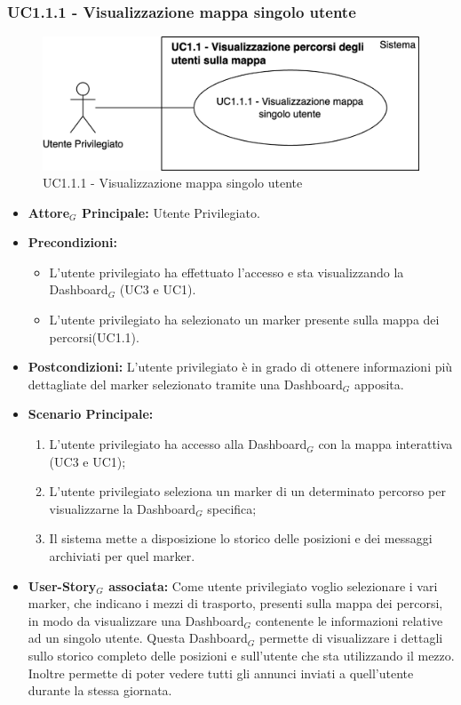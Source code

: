 \documentclass[11pt]{article}
\begin{document}
\begin{justify}
\subsubsection{\textbf{UC1.1.1 - Visualizzazione mappa singolo utente}}
\begin{figure}[H]
    \centering
    \includegraphics[width=0.7\linewidth]{UC1.1.1imagee.png}
    \caption{UC1.1.1 - Visualizzazione mappa singolo utente}
    \label{fig:UC1.1.1}
\end{figure}
\label{UC1.1.1}
\begin{itemize}
     \item \textbf{Attore$_G$ Principale:} Utente Privilegiato.
     \item \textbf{Precondizioni:}
        \begin{itemize}
    		\item L'utente privilegiato ha effettuato l'accesso e sta      visualizzando la Dashboard$_G$ (UC3 e UC1).
    	        \item L'utente privilegiato ha selezionato un marker  presente sulla mappa dei percorsi(UC1.1).
        \end{itemize}
     \item \textbf{Postcondizioni:} L'utente privilegiato è in grado di ottenere informazioni più dettagliate del marker selezionato tramite una Dashboard$_G$ apposita.
     \item \textbf{Scenario Principale:}
        \begin{enumerate}
            \item L'utente privilegiato ha accesso alla Dashboard$_G$ con la mappa interattiva (UC3 e UC1);
            \item L'utente privilegiato seleziona un marker di un determinato percorso per visualizzarne la Dashboard$_G$ specifica;
            \item Il sistema mette a disposizione lo storico delle posizioni e dei messaggi archiviati per quel marker.
        \end{enumerate}
     \item \textbf{User-Story$_G$ associata:}
     Come utente privilegiato voglio selezionare i vari marker, che indicano i mezzi di trasporto, presenti sulla mappa dei percorsi, in modo da visualizzare una Dashboard$_G$ contenente le informazioni relative ad un singolo utente. Questa Dashboard$_G$ permette di visualizzare i dettagli sullo storico completo delle posizioni e sull'utente che sta utilizzando il mezzo. Inoltre permette di poter vedere tutti gli annunci inviati a quell'utente durante la stessa giornata.
\end{itemize}


\end{justify}
\end{document}
